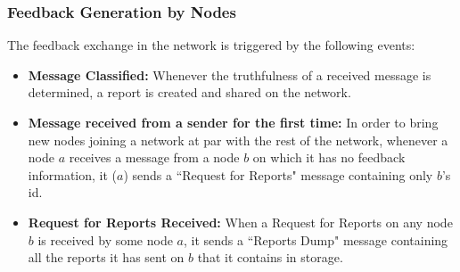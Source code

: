 \documentclass[journal]{IEEEtran}
\begin{document}
\subsubsection{Feedback Generation by Nodes}
The feedback exchange in the network is triggered by the following events:
\begin{itemize}
	\item \textbf{Message Classified:} Whenever the truthfulness of a received message is determined, a report is created and shared on the network.
	\item \textbf{Message received from a sender for the first time:} In order to bring new nodes joining a network at par with the rest of the network, whenever a node $ a $ receives a message from a node $ b $ on which it has no feedback information, it ($ a $) sends a ``Request for Reports" message containing only $ b $'s id.
	\item \textbf{Request for Reports Received:} When a Request for Reports on any node $ b $ is received by some node $ a $, it sends a ``Reports Dump" message containing all the reports it has sent on $ b $ that it contains in storage.
\end{itemize}
\end{document}
